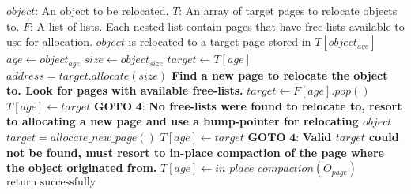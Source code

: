 \begin{algorithm}[H]
    \caption{$(O, T, F)$}
    \label{alg:use}
    \begin{algorithmic}[1]
        \Require 
        \Statex $object$: An object to be relocated.
        \Statex $T$: An array of target pages to relocate objects to.
        \Statex $F$: A list of lists. Each nested list contain pages that have free-lists available to use for allocation.
        \Ensure 
        \Statex $object$ is relocated to a target page stored in $T[object_{age}]$ 
        \State $age \gets object_{age}$
        \State $size \gets object_{size}$
        \State $target \gets T[age]$
        \State $address = target.allocate(size)$
         
            \Statex \textbf{Find a new page to relocate the object to. Look for pages with available free-lists.}
            \State $target \gets F[age].pop()$
                \State $T[age] \gets target$
                \State $\textbf{GOTO 4:}$
            \EndIf
            \Statex \textbf{No free-lists were found to relocate to, resort to allocating a new page and use a bump-pointer for relocating $object$}
            \State $target = allocate\_new\_page()$ 
                \State $T[age] \gets target$
                \State $\textbf{GOTO 4:}$
            \EndIf
            \Statex \textbf{Valid $target$ could not be found, must resort to in-place compaction of the page where the object originated from.}
            \State $T[age] \gets in\_place\_compaction(O_{page})$
        \EndIf
        \State $\text{return successfully}$
    \end{algorithmic}
\end{algorithm}


